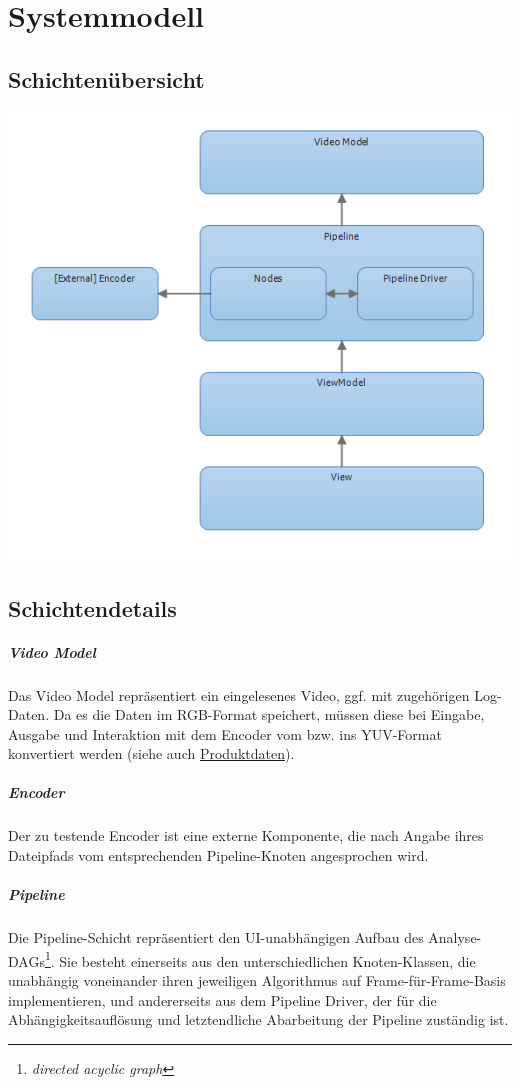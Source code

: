 \section{Systemmodell}

\subsection{Schichtenübersicht}
\includegraphics[scale=0.75]{resources/Layers}

\subsection{Schichtendetails}

\subparagraph{Video Model}
Das Video Model repräsentiert ein eingelesenes Video, ggf. mit zugehörigen
Log-Daten. Da es die Daten im RGB-Format speichert, müssen diese bei Eingabe,
Ausgabe und Interaktion mit dem Encoder vom bzw. ins YUV-Format konvertiert
werden (siehe auch \hyperref[sec:produktdaten]{Produktdaten}).

\subparagraph{Encoder}
Der zu testende Encoder ist eine externe Komponente, die nach Angabe ihres
Dateipfads vom entsprechenden Pipeline-Knoten angesprochen wird.

\subparagraph{Pipeline}
Die Pipeline-Schicht repräsentiert den UI-unabhängigen Aufbau des
Analyse-DAGs\footnote{\emph{directed acyclic graph}}. Sie besteht einerseits aus
den unterschiedlichen Knoten-Klassen, die unabhängig voneinander ihren
jeweiligen Algorithmus auf Frame-für-Frame-Basis implementieren, und
andererseits aus dem Pipeline Driver, der für die Abhängigkeitsauflösung und
letztendliche Abarbeitung der Pipeline zuständig ist.

